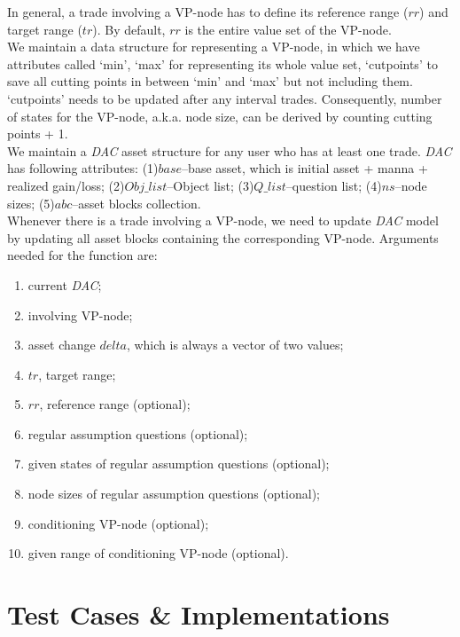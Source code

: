 \documentclass[onecolumn]{article}
\begin{document}
In general, a trade involving a VP-node has to define its reference range ($rr$) and target range ($tr$). By default, $rr$ is the entire value set of the VP-node. \\[1pt]

We maintain a data structure for representing a VP-node, in which we have attributes called `min', `max' for representing its whole value set, `cutpoints' to save all cutting points in between `min' and `max' but not including them. `cutpoints' needs to be updated after any interval trades. Consequently, number of states for the VP-node, a.k.a. node size, can be derived by counting cutting points + 1. \\[1pt]

We maintain a \textit{DAC} asset structure for any user who has at least one trade. \textit{DAC} has following attributes: (1)$base$--base asset, which is initial asset + manna + realized gain/loss; (2)$Obj\_list$--Object list; (3)$Q\_list$--question list; (4)$ns$--node sizes; (5)$abc$--asset blocks collection.  \\[1pt]

Whenever there is a trade involving a VP-node, we need to update \textit{DAC} model by updating all asset blocks containing the corresponding VP-node. Arguments needed for the function are: 
\begin{enumerate}
	\item current \textit{DAC}; 
	\item involving VP-node; 
	\item asset change $delta$, which is always a vector of two values; 
	\item $tr$, target range; 
	\item $rr$, reference range (optional); 
	\item regular assumption questions (optional); 
	\item given states of regular assumption questions (optional); 
	\item node sizes of regular assumption questions (optional); 
	\item conditioning VP-node (optional); 
	\item given range of conditioning VP-node (optional).
\end{enumerate}


\section{Test Cases \& Implementations} \label{sec:testcase}
\end{document}
